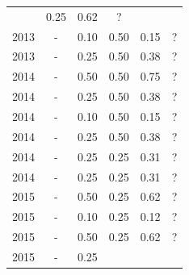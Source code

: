 \begin{table}[H]
\begin{tabular}{| l | c | c | c | c | c |}
          &
          0.25
          &
            {\color{blue} 0.62}
          &
          ?
          \\
            2013
          &
          -
          &
          0.10
          &
          0.50
          &
            {\color{red} 0.15}
          &
          ?
          \\
            2013
          &
          -
          &
          0.25
          &
          0.50
          &
            {\color{red} 0.38}
          &
          ?
          \\
\hline
            2014
          &
          -
          &
          0.50
          &
          0.50
          &
            {\color{blue} 0.75}
          &
          ?
          \\
            2014
          &
          -
          &
          0.25
          &
          0.50
          &
            {\color{red} 0.38}
          &
          ?
          \\
            2014
          &
          -
          &
          0.10
          &
          0.50
          &
            {\color{red} 0.15}
          &
          ?
          \\
            2014
          &
          -
          &
          0.25
          &
          0.50
          &
            {\color{red} 0.38}
          &
          ?
          \\
            2014
          &
          -
          &
          0.25
          &
          0.25
          &
            {\color{red} 0.31}
          &
          ?
          \\
            2014
          &
          -
          &
          0.25
          &
          0.25
          &
            {\color{red} 0.31}
          &
          ?
          \\
\hline
            2015
          &
          -
          &
          0.50
          &
          0.25
          &
            {\color{blue} 0.62}
          &
          ?
          \\
            2015
          &
          -
          &
          0.10
          &
          0.25
          &
            {\color{red} 0.12}
          &
          ?
          \\
            2015
          &
          -
          &
          0.50
          &
          0.25
          &
            {\color{blue} 0.62}
          &
          ?
          \\
            2015
          &
          -
          &
          0.25
          &

\end{tabular}
\end{table}
